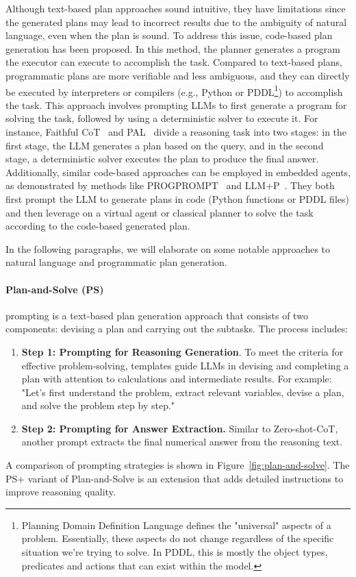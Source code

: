 Although text-based plan approaches sound intuitive, they have limitations since the generated plans may lead to incorrect results due to the ambiguity of natural language, even when the plan is sound.
To address this issue, code-based plan generation has been proposed.
In this method, the planner generates a program the executor can execute to accomplish the task.
Compared to text-based plans, programmatic plans are more verifiable and less ambiguous, and they can directly be executed by interpreters or compilers (e.g., Python or PDDL\footnote{Planning Domain Definition Language defines the "universal" aspects of a problem. Essentially, these aspects do not change regardless of the specific situation we’re trying to solve. In PDDL, this is mostly the object types, predicates and actions that can exist within the model.}) to accomplish the task.
This approach involves prompting LLMs to first generate a program for solving the task, followed by using a deterministic solver to execute it.
For instance, Faithful CoT~\cite{lyu2023faithful} and PAL~\cite{gao2022pal} divide a reasoning task into two stages: in the first stage, the LLM generates a plan based on the query, and in the second stage, a deterministic solver executes the plan to produce the final answer.
Additionally, similar code-based approaches can be employed in embedded agents, as demonstrated by methods like PROGPROMPT~\cite{singh2022progprompt} and LLM+P~\cite{liu2023llmp}.
They both first prompt the LLM to generate plans in code (Python functions or PDDL files) and then leverage on a virtual agent or classical planner to solve the task according to the code-based generated plan.

In the following paragraphs, we will elaborate on some notable approaches to natural language and programmatic plan generation.

\paragraph{Plan-and-Solve (PS)}
\label{par:plan-and-solve}

prompting is a text-based plan generation approach that consists of two components: devising a plan and carrying out the subtasks.
The process includes:
\begin{enumerate}
	\item \textbf{Step 1: Prompting for Reasoning Generation}. To meet the criteria for effective problem-solving, templates guide LLMs in devising and completing a plan with attention to calculations and intermediate results. For example: "Let's first understand the problem, extract relevant variables, devise a plan, and solve the problem step by step."
	\item \textbf{Step 2: Prompting for Answer Extraction.} Similar to Zero-shot-CoT, another prompt extracts the final numerical answer from the reasoning text.
\end{enumerate}
A comparison of prompting strategies is shown in Figure~\ref{fig:plan-and-solve}.
The PS+ variant of Plan-and-Solve is an extension that adds detailed instructions to improve reasoning quality.

